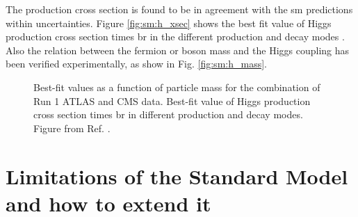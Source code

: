 The production cross section is found to be in agreement with the \gls{sm} predictions within uncertainties. Figure \ref{fig:sm:h_xsec} shows the best fit value of Higgs production cross section times \gls{br} in the different production and decay modes \cite{Khachatryan:2016vau}. Also the relation between the fermion or boson mass and the Higgs coupling has been verified experimentally, as show in Fig. \ref{fig:sm:h_mass}. 

\begin{figure}[ht]
\centering
{}
\caption{ Best-fit values as a function of particle mass for the combination of Run 1 ATLAS and CMS data.  Best-fit value of Higgs production cross section times \gls{br} in different production and decay modes. Figure from Ref.  \cite{Khachatryan:2016vau}.}
\label{fig:sm:h_couplings_mass}
\end{figure}

 


\section{Limitations of the Standard Model and how to extend it}
\label{sec:smsusy:bsm}

